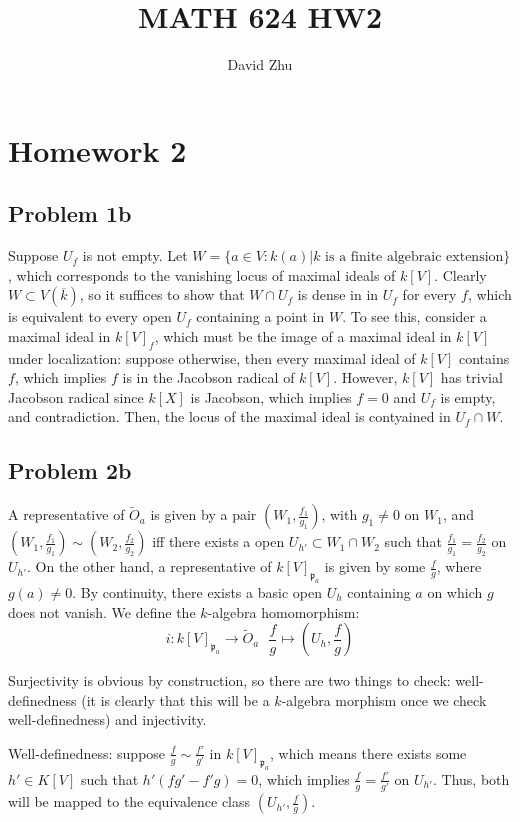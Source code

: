 \documentclass{article}
\title{MATH 624 HW2}
\author{David Zhu}
\theoremstyle{definition}
\theoremstyle{definition}
\theoremstyle{definition}
\theoremstyle{definition}
\theoremstyle{definition}
\theoremstyle{definition}
\theoremstyle{definition}
\begin{document}
\maketitle

\section*{Homework 2}



\subsection*{Problem 1b}
Suppose $U_f$ is not empty. Let $W=\{ a\in V: k(a)|k \textrm{ is a finite algebraic extension} \}$, which corresponds to the vanishing locus of maximal ideals of $k[V]$. Clearly $W\subset V(\overline{k})$, so it suffices to show that $W\cap U_f$ is dense in in $U_f$ for every $f$, which is equivalent to every open $U_f$ containing a point in $W$. To see this, consider a maximal ideal in $k[V]_f$, which must be the image of a maximal ideal in $k[V]$ under localization: suppose otherwise, then every maximal ideal of $k[V]$ contains $f$, which implies $f$ is in the Jacobson radical of $k[V]$. However, $k[V]$ has trivial Jacobson radical since $k[X]$ is Jacobson, which implies $f=0$ and $U_f$ is empty, and contradiction. Then, the locus of the maximal ideal is contyained in $U_f\cap W$.


\subsection*{Problem 2b}
A representative of $\tilde{O}_a$ is given by a pair $(W_1, \frac{f_1}{g_1})$, with $g_1\neq 0$ on $W_1$, and $(W_1, \frac{f_1}{g_1})\sim (W_2, \frac{f_2}{g_2})$ iff there exists a open $U_{h'}\subset W_1\cap W_2$ such that $\frac{f_1}{g_1}=\frac{f_2}{g_2}$ on $U_{h'}$. On the other hand, a representative of $k[V]_{\mathfrak{p}_a}$ is given by some $\frac{f}{g}$, where $g(a)\neq 0$. By continuity, there exists a basic open $U_h$ containing $a$ on which $g$ does not vanish. We define the $k$-algebra homomorphism: 
\[i: k[V]_{\mathfrak{p}_a}\to \tilde{O}_a  \ \ \ \frac{f}{g}\mapsto (U_h, \frac{f}{g})\]

Surjectivity is obvious by construction, so there are two things to check: well-definedness (it is clearly that this will be a $k$-algebra morphism once we check well-definedness) and injectivity.

Well-definedness: suppose $\frac{f}{g}\sim \frac{f'}{g'}$ in $k[V]_{\mathfrak{p}_a}$, which means there exists some $h'\in K[V]$ such that $h'(fg'-f'g)=0$, which implies $\frac{f}{g}=\frac{f'}{g'}$ on $U_{h'}$. Thus, both will be mapped to the equivalence class $(U_{h'},\frac{f}{g})$.
\end{document}
